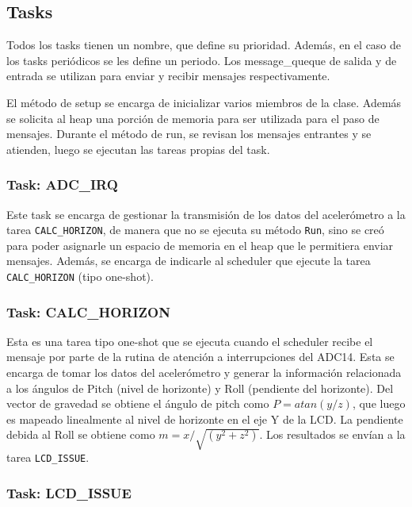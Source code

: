 \subsection{Tasks}
\label{sec:tasks}

Todos los tasks tienen un nombre, que define su prioridad. Además, en el caso de
los tasks periódicos se les define un periodo. Los message\_queque de salida y
de entrada se utilizan para enviar y recibir mensajes respectivamente.

El método de setup se encarga de inicializar varios miembros de la clase. Además
se solicita al heap una porción de memoria para ser utilizada para el paso de
mensajes. Durante el método de run, se revisan los mensajes entrantes y se
atienden, luego se ejecutan las tareas propias del task.

\subsubsection{Task: ADC\_IRQ}
\label{sec:adc_irq}

Este task se encarga de gestionar la transmisión de los datos del acelerómetro a
la tarea \texttt{CALC\_HORIZON}, de manera que no se ejecuta su método
\texttt{Run}, sino se creó para poder asignarle un espacio de memoria en el heap
que le permitiera enviar mensajes. Además, se encarga de indicarle al scheduler
que ejecute la tarea \texttt{CALC\_HORIZON} (tipo one-shot).

\subsubsection{Task: CALC\_HORIZON}
\label{sec:calc_horizon}
Esta es una tarea tipo one-shot que se ejecuta cuando el scheduler recibe el
mensaje por parte de la rutina de atención a interrupciones del ADC14. Esta se
encarga de tomar los datos del acelerómetro y generar la información relacionada
a los ángulos de Pitch (nivel de horizonte) y Roll (pendiente del horizonte).
Del vector de gravedad se obtiene el ángulo de pitch como $P = atan(y/z)$, que
luego es mapeado linealmente al nivel de horizonte en el eje Y de la LCD. La
pendiente debida al Roll se obtiene como $m = x/\sqrt{(y^2+z^2)}$. Los
resultados se envían a la tarea \texttt{LCD\_ISSUE}.

\subsubsection{Task: LCD\_ISSUE}
\label{sec:lcd_issue}


